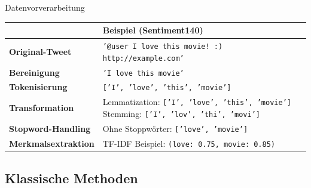 \documentclass[aspectratio=169]{beamer} %
\begin{document}
\begin{frame}{Datenvorverarbeitung}
  \fontsize{10pt}{12pt}\selectfont
  \vspace{0.3cm}

 \begin{table}[]
      \centering
      \renewcommand{\arraystretch}{1.2}
      \begin{tabular}{l|p{7.5cm}}
          \hline
          & \textbf{Beispiel (Sentiment140)} \\
          \hline
          \textbf{Original-Tweet} & \texttt{'@user I love this movie! :) http://example.com'} \\
          \hline
          \textbf{Bereinigung} & \texttt{'I love this movie'} \\
          \hline
          \textbf{Tokenisierung} & \texttt{['I', 'love', 'this', 'movie']} \\
          \hline
          \textbf{Transformation} & Lemmatization: \texttt{['I', 'love', 'this', 'movie']} \newline
          Stemming: \texttt{['I', 'lov', 'thi', 'movi']} \\
          \hline
          \textbf{Stopword-Handling} & Ohne Stoppwörter: \texttt{['love', 'movie']} \\
          \hline
          \textbf{Merkmalsextraktion} & TF-IDF Beispiel: \newline
          \texttt{(love: 0.75, movie: 0.85)} \\
          \hline
      \end{tabular}
  \end{table}

\end{frame}

\subsection{Klassische Methoden}
\end{document}
